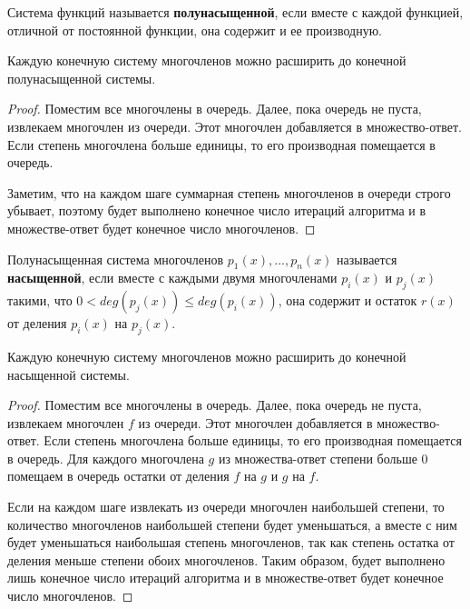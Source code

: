 \begin{definition}\cite{lect1}
    Система функций называется \textbf{полунасыщенной}, если вместе с каждой функцией, отличной от постоянной функции, она содержит и ее производную.
\end{definition}

\begin{proposal}\cite{lect1}
    Каждую конечную систему многочленов можно расширить до конечной полунасыщенной системы.
\end{proposal}
\begin{proof}
    Поместим все многочлены в очередь. Далее, пока очередь не пуста, извлекаем многочлен из очереди. Этот многочлен добавляется в множество-ответ. Если степень многочлена больше единицы, то его производная помещается в очередь. 
    
    Заметим, что на каждом шаге суммарная степень многочленов в очереди строго убывает, поэтому будет выполнено конечное число итераций алгоритма и в множестве-ответ будет конечное число многочленов.
\end{proof}

\begin{definition}\cite{lect1}
    Полунасыщенная система многочленов $p_1(x), ... , p_n(x)$ называется \textbf{насыщенной}, если вместе с каждыми двумя многочленами $p_i(x)$ и $p_j(x)$ такими, что $0 < deg(p_j(x)) \leq deg(p_i(x))$, она содержит и остаток $r(x)$ от деления $p_i(x)$ на $p_j(x)$. 
\end{definition}

\begin{proposal}\cite{lect1}
    Каждую конечную систему многочленов можно расширить до конечной насыщенной системы.
\end{proposal}
\begin{proof}
    Поместим все многочлены в очередь. Далее, пока очередь не пуста, извлекаем многочлен $f$ из очереди. Этот многочлен добавляется в множество-ответ. Если степень многочлена больше единицы, то его производная помещается в очередь. Для каждого многочлена $g$ из множества-ответ степени больше $0$ помещаем в очередь остатки от деления $f$ на $g$ и $g$ на $f$.
    
    Если на каждом шаге извлекать из очереди многочлен наибольшей степени, то количество многочленов наибольшей степени будет уменьшаться, а вместе с ним будет уменьшаться наибольшая степень многочленов, так как степень остатка от деления меньше степени обоих многочленов. Таким образом, будет выполнено лишь конечное число итераций алгоритма и в множестве-ответ будет конечное число многочленов.
\end{proof}


